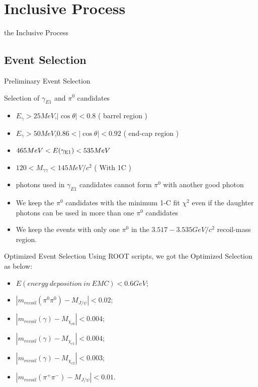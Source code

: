 \documentclass{beamer}
\begin{document}
\section{Inclusive Process}
\begin{frame}
\begin{block}{}
\begin{center}
\bigskip
\huge{the Inclusive Process}
\bigskip
\end{center}
\end{block}
\end{frame}
\subsection{Event Selection}
\begin{frame}{Preliminary Event Selection}
\begin{block}{Selection of $\gamma_{E1}$ and $\pi^0$ candidates}
\begin{itemize}
\item $E_{\gamma}>25 MeV$,$|\cos\theta|<0.8$ ( barrel region )
\item $E_{\gamma}>50 MeV$,$0.86<|\cos\theta|<0.92$ ( end-cap region )
\item $465MeV < E({\gamma}_{{\rm E1}}) < 535MeV$
\item $120<M_{\gamma \gamma}<145 MeV/c^2$ ( With 1C )
\item photons used in $\gamma_{E1}$ candidates cannot form $\pi^0$ with another good photon
\item We keep the $\pi^0$ candidates with the minimum 1-C fit $\chi^2$ even if the daughter photons can be used in more than one $\pi^0$ candidates
\item We keep the events with only one $\pi^0$ in the $3.517-3.535GeV/c^2$ recoil-mass region.
\end{itemize}
\end{block}
\end{frame}
\begin{frame}{Optimized Event Selection}
Using ROOT scripts, we got the Optimized Selection as below:
\begin{itemize}
\item $E(energy~ deposition~  in~  EMC)<0.6GeV$;
\item $|m_{recoil}(\pi^0 \pi^0)-M_{J/\psi}|<0.02$;
\item $|m_{recoil}(\gamma)-M_{\chi_{c0}}|<0.004$;
\item $|m_{recoil}(\gamma)-M_{\chi_{c1}}|<0.004$;
\item $|m_{recoil}(\gamma)-M_{\chi_{c2}}|<0.003$;
\item $|m_{recoil}(\pi^+ \pi^-)-M_{J/\psi}|<0.01$.
\end{itemize}
\end{frame}
\end{document}
